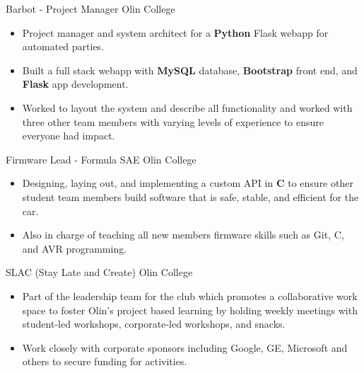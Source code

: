 \documentclass[11 pt]{moderncv}
\begin{document}
{Barbot -  Project Manager}
{Olin College}
{}
{}
{
\begin{itemize}
	\item Project manager and system architect for a \textbf{Python} Flask webapp for automated parties. 
	\item Built a full stack webapp with \textbf{MySQL} database, \textbf{Bootstrap} front end, and \textbf{Flask} app development. 
	\item Worked to layout the system and describe all functionality and worked with three other team members with varying levels of experience to ensure everyone had impact. 
\end{itemize}
}

{Firmware Lead - Formula SAE}
{Olin College}
{}
{}
{
\begin{itemize}
	\item Designing, laying out, and implementing a custom API in \textbf{C} to ensure other student team members build software that is safe, stable, and efficient for the car. 
	\item Also in charge of teaching all new members firmware skills such as Git, C, and AVR programming.
\end{itemize}
}

{SLAC (Stay Late and Create)}
{Olin College}
{}
{}
{
\begin{itemize}
	\item Part of the leadership team for the club which promotes a collaborative work space to foster Olin's project based learning by holding weekly meetings with student-led workshops, corporate-led workshops, and snacks. 
	\item Work closely with corporate sponsors including Google, GE, Microsoft and others to secure funding for activities. 
\end{itemize}
}

\iffalse
\cventry{2014-Present}
{Sound Engineer}
{Freelance}
{Portland, OR}
{}
{
\begin{itemize}
	\item Self taught in the practice of live sound engineering including choosing equipment, setting it up, and running advanced shows. Engineered at music festivals, theatrical productions, and musicals including troubleshooting and organizing sound arrays. 
	\item Installed fulls sound systems including equipment, software, and training.
\end{itemize}
}
\fi
\end{document}
